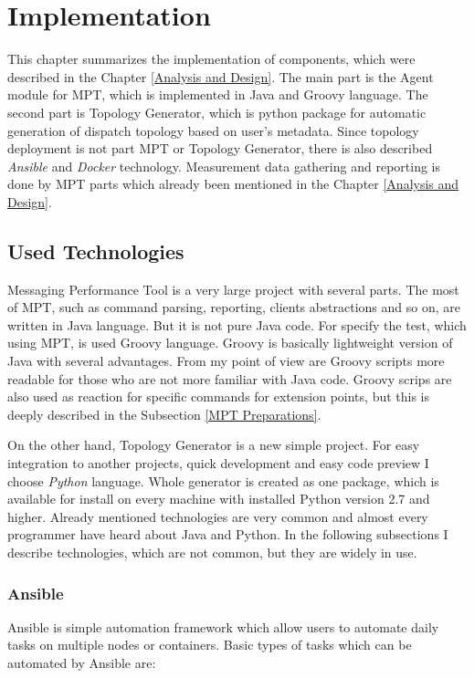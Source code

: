\chapter{Implementation}
\label{Implementation}
This chapter summarizes the implementation of components, which were described in the Chapter \ref{Analysis and Design}. The main part is the Agent module for MPT, which is implemented in Java and Groovy language. The second part is Topology Generator, which is python package for automatic generation of dispatch topology based on user's metadata. Since topology deployment is not part MPT or Topology Generator, there is also described \emph{Ansible} and \emph{Docker} technology. Measurement data gathering and reporting is done by MPT parts which already been mentioned in the Chapter \ref{Analysis and Design}.


\section{Used Technologies}
Messaging Performance Tool is a very large project with several parts. The most of MPT, such as command parsing, reporting, clients abstractions and so on, are written in Java language. But it is not pure Java code. For specify the test, which using MPT, is used Groovy language. Groovy is basically lightweight version of Java with several advantages. From my point of view are Groovy scripts more readable for those who are not more familiar with Java code. Groovy scrips are also used as reaction for specific commands for extension points, but this is deeply described in the Subsection \ref{MPT Preparations}.

On the other hand, Topology Generator is a new simple project. For easy integration to another projects, quick development and easy code preview I choose \emph{Python} language. Whole generator is created as one package, which is available for install on every machine with installed Python version 2.7 and higher. Already mentioned technologies are very common and almost every programmer have heard about Java and Python. In the following subsections I describe technologies, which are not common, but they are widely in use.

\subsection{Ansible}
Ansible \cite{Ansible} is simple automation framework which allow users to automate daily tasks on multiple nodes or containers. Basic types of tasks which can be automated by Ansible are:

